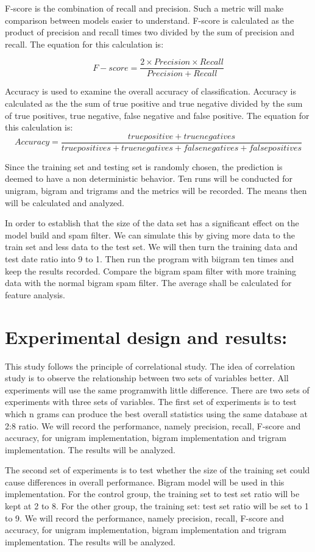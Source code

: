 \documentclass{article}
\begin{document}
F-score is the combination of recall and precision. Such a metric will make comparison between models easier to understand. F-score is calculated as the product of precision and recall times two divided by the sum of precision and recall. The equation for this calculation is:

\[F-score=\frac{2\times Precision\times Recall}{Precision+Recall}\]


Accuracy is used to examine the overall accuracy of classification. Accuracy is calculated as the the sum of true positive and true negative divided by the sum of true positives, true negative, false negative and false positive. The equation for this calculation is:
\[Accuracy=\frac{true positive+true negatives}{true positives+true negatives+false negatives+false positives}\]

Since the training set and testing set is randomly chosen, the prediction is deemed to have a non deterministic behavior. Ten runs will be conducted for unigram, bigram and trigrams and the metrics will be recorded. The means then will be calculated and analyzed. 


In order to establish that the size of the data set has a significant effect on the model build and spam filter. We can simulate this by giving more data to the train set and less data to the test set. We will then turn the training data and test date ratio into 9 to 1. Then run the program with biigram ten times and keep the results recorded. Compare the bigram spam filter with more training data with the normal bigram spam filter. The average shall be calculated for feature analysis. 

\section{Experimental design and results:}
This study follows the principle of correlational study. The idea of correlation study is to observe the relationship between two sets of variables better. All experiments will use the same program\footnotemark[1] with little difference. There are two sets of experiments with three sets of variables. The first set of experiments is to test which n grams can produce the best overall statistics using the same database at 2:8 ratio. We will record the performance, namely precision, recall, F-score and accuracy, for unigram implementation, bigram implementation and trigram implementation. The results will be analyzed. 

The second set of experiments is to test whether the size of the training set could cause differences in overall performance. Bigram model will be used in this implementation. For the control group, the training set to test set ratio will be kept at 2 to 8. For the other group, the training set: test set ratio will be set to  1 to 9. We will record the performance, namely precision, recall, F-score and accuracy, for unigram implementation, bigram implementation and trigram implementation. The results will be analyzed. 
\end{document}
